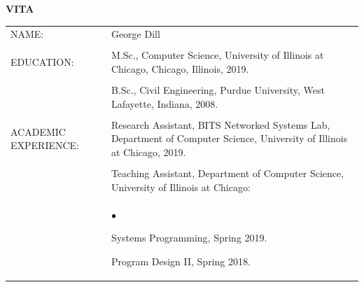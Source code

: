 \documentclass{uicthesi}
\newcommand{\squishlist}{
   \begin{list}{$\bullet$}
    { \setlength{\itemsep}{-.1ex}      \setlength{\parsep}{0ex}
      \setlength{\topsep}{0ex}       \setlength{\partopsep}{0ex}
      \setlength{\leftmargin}{.8em} \setlength{\labelwidth}{1em}
      \setlength{\labelsep}{0.5em} } }
\newcommand{\squishend}{\end{list}}
\begin{document}
%
%
%
%
%
%
%
%
%
%

\bibformb

\newpage
\clearpage
    \pagestyle{pageontop}
   \thispagestyle{pageonbottom}
   \begin{large}
   \begin{center}
   {\bfseries VITA}
   \end{center}
   \end{large}
\begin{tabular}{p{2.8cm}p{10.5cm}}
NAME: & George Dill  \\ 
    &\\
EDUCATION:  &M.Sc., Computer Science, University of Illinois at Chicago, Chicago, Illinois, 2019. \\  
            &\\
            &B.Sc., Civil Engineering, Purdue University, West Lafayette, Indiana, 2008.  \\
            &\\
ACADEMIC EXPERIENCE:  &Research Assistant, BITS Networked Systems Lab, Department of Computer Science, University of Illinois at Chicago, 2019. \\
            &\\
            &Teaching Assistant, Department of Computer Science, University of Illinois at Chicago: \\
            &\squishlist            
            \item Systems Programming, Spring 2019.    
            \item Program Design II, Spring 2018.
            \squishend \\
            

 \end{tabular}
\end{document}
